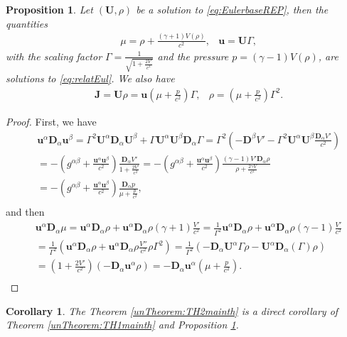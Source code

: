 \documentclass[a4paper, 15pt]{article}
\numberwithin{equation}{section}
\newtheorem{propal}[defi]{Proposition}
\newtheorem{cor}[defi]{Corollary}
\begin{document}
\begin{propal}
 \label{propal:equivrelatEul}
    Let $(\textbf{U},\rho)$ be a solution to \eqref{eq:EulerbaseREP}, then the quantities 
    \begin{align}
    \label{eq:scaling1relatEuler}
        &\mu=\rho+\frac{(\gamma+1)V(\rho)}{c^2}, &\textbf{u}=\textbf{U}\Gamma,
    \end{align}
    with the scaling factor $\Gamma=\frac{1}{\sqrt{1+\frac{2V'}{c^2}}}$ and the pressure $p=(\gamma-1)V(\rho)$,  
    are solutions to \eqref{eq:relatEul}. We also have 
      \begin{align}
      \label{eq:scaling2relatEuler}
        &\textbf{J}=\textbf{U}\rho=\textbf{u}(\mu+\frac{p}{c^2})\Gamma, &\rho=(\mu+\frac{p}{c^2})\Gamma^2.
    \end{align}
\end{propal}
\begin{proof}
    First, we have 
    \begin{align*}
         &\textbf{u}^\alpha\textbf{D}_\alpha \textbf{u}^\beta=\Gamma^2 \textbf{U}^\alpha\textbf{D}_\alpha \textbf{U}^\beta+\Gamma \textbf{U}^\alpha \textbf{U}^\beta \textbf{D}_\alpha\Gamma=\Gamma^2(-\textbf{D}^\beta V'-\Gamma^2 \textbf{U}^\alpha \textbf{U}^\beta \frac{\textbf{D}_\alpha V'}{c^2})\\
         &=-(g^{\alpha\beta}+\frac{\textbf{u}^\alpha \textbf{u}^\beta}{c^2})\frac{\textbf{D}_\alpha V'}{1+\frac{2V'}{c^2}}=-(g^{\alpha\beta}+\frac{\textbf{u}^\alpha \textbf{u}^\beta}{c^2})\frac{(\gamma-1)V'\textbf{D}_\alpha\rho}{\rho+\frac{2\gamma V}{c^2}}\\
         &=-(g^{\alpha\beta}+\frac{\textbf{u}^\alpha \textbf{u}^\beta}{c^2})\frac{\textbf{D}_\alpha p}{\mu+\frac{p}{c^2}},\\
    \end{align*}
    and then 
        \begin{align*}
         &\textbf{u}^\alpha\textbf{D}_\alpha \mu=\textbf{u}^\alpha\textbf{D}_\alpha \rho +\textbf{u}^\alpha\textbf{D}_\alpha \rho (\gamma+1)\frac{V'}{c^2}=\frac{1}{\Gamma^2}\textbf{u}^\alpha\textbf{D}_\alpha \rho +\textbf{u}^\alpha\textbf{D}_\alpha \rho (\gamma-1)\frac{V'}{c^2}\\
         &=\frac{1}{\Gamma^2}(\textbf{u}^\alpha\textbf{D}_\alpha \rho +\textbf{u}^\alpha\textbf{D}_\alpha \rho\frac{V''}{c^2}\rho\Gamma^2)=\frac{1}{\Gamma^2}(-\textbf{D}_\alpha \textbf{U}^\alpha\Gamma\rho -\textbf{U}^\alpha\textbf{D}_\alpha(\Gamma)\rho)\\
         &=(1+\frac{2V'}{c^2})(-\textbf{D}_\alpha \textbf{u}^\alpha\rho)=-\textbf{D}_\alpha \textbf{u}^\alpha(\mu+\frac{p}{c^2}).\\
    \end{align*}
\end{proof}
\begin{cor}
\label{cor:theoremrelatiEul}
    The Theorem \ref{unTheorem:TH2mainth} is a direct corollary of Theorem \ref{unTheorem:TH1mainth} and Proposition \ref{propal:equivrelatEul}.
\end{cor}
\end{document}
